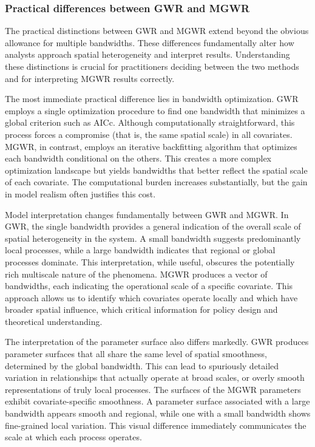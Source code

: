 \documentclass[smallextended, natbib]{svjour3}       %
\begin{document}
\subsubsection*{Practical differences between GWR and MGWR}

The practical distinctions between GWR and MGWR extend beyond the obvious allowance for multiple bandwidths. 
These differences fundamentally alter how analysts approach spatial heterogeneity and interpret results. 
Understanding these distinctions is crucial for practitioners deciding between the two methods and for interpreting MGWR results correctly.

The most immediate practical difference lies in bandwidth optimization. 
GWR employs a single optimization procedure to find one bandwidth that minimizes a global criterion such as AICc. 
Although computationally straightforward, this process forces a compromise (that is, the same spatial scale) in all covariates. 
MGWR, in contrast, employs an iterative backfitting algorithm that optimizes each bandwidth conditional on the others. 
This creates a more complex optimization landscape but yields bandwidths that better reflect the spatial scale of each covariate.
The computational burden increases substantially, but the gain in model realism often justifies this cost.

Model interpretation changes fundamentally between GWR and MGWR. 
In GWR, the single bandwidth provides a general indication of the overall scale of spatial heterogeneity in the system. 
A small bandwidth suggests predominantly local processes, while a large bandwidth indicates that regional or global processes dominate. 
This interpretation, while useful, obscures the potentially rich multiscale nature of the phenomena. 
MGWR produces a vector of bandwidths, each indicating the operational scale of a specific covariate. 
This approach allows us to identify which covariates operate locally and which have broader spatial influence, which critical information for policy design and theoretical understanding.

The interpretation of the parameter surface also differs markedly. 
GWR produces parameter surfaces that all share the same level of spatial smoothness, determined by the global bandwidth. 
This can lead to spuriously detailed variation in relationships that actually operate at broad scales, or overly smooth representations of truly local processes. 
The surfaces of the MGWR parameters exhibit covariate-specific smoothness.
A parameter surface associated with a large bandwidth appears smooth and regional, while one with a small bandwidth shows fine-grained local variation. 
This visual difference immediately communicates the scale at which each process operates.
\end{document}
